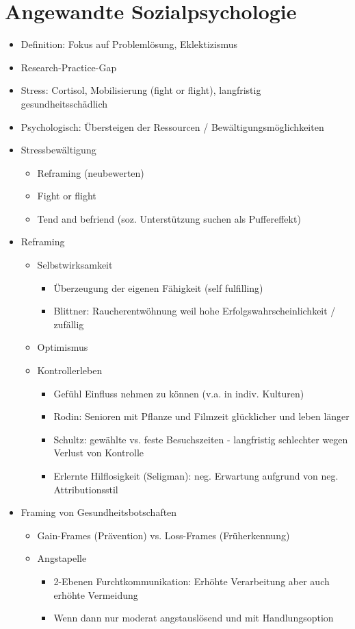 \documentclass[11pt, paper=a4, twocolumn]{scrartcl}
\begin{document}
	\section{Angewandte Sozialpsychologie}
		\begin{itemize}
			\item Definition: Fokus auf Problemlösung, Eklektizismus
			\item Research-Practice-Gap
			\item Stress: Cortisol, Mobilisierung (fight or flight), langfristig gesundheitsschädlich
			\item Psychologisch: Übersteigen der Ressourcen / Bewältigungsmöglichkeiten
			\item Stressbewältigung
				\begin{itemize}
					\item Reframing (neubewerten)
					\item Fight or flight
					\item Tend and befriend (soz. Unterstützung suchen als Puffereffekt)
				\end{itemize}
			\item Reframing
				\begin{itemize}
					\item Selbstwirksamkeit
						\begin{itemize}
							\item Überzeugung der eigenen Fähigkeit (self fulfilling)
							\item Blittner: Raucherentwöhnung weil hohe Erfolgswahrscheinlichkeit / zufällig
						\end{itemize}
					\item Optimismus
					\item Kontrollerleben
						\begin{itemize}
							\item Gefühl Einfluss nehmen zu können (v.a. in indiv. Kulturen)
							\item Rodin: Senioren mit Pflanze und Filmzeit glücklicher und leben länger
							\item Schultz: gewählte vs. feste Besuchszeiten - langfristig schlechter wegen Verlust von 
								Kontrolle
							\item Erlernte Hilflosigkeit (Seligman): neg. Erwartung aufgrund von neg. Attributionsstil
						\end{itemize}
				\end{itemize}
			\item Framing von Gesundheitsbotschaften
				\begin{itemize}
					\item Gain-Frames (Prävention) vs. Loss-Frames (Früherkennung)
					\item Angstapelle
						\begin{itemize}
							\item 2-Ebenen Furchtkommunikation: Erhöhte Verarbeitung aber auch erhöhte Vermeidung
							\item Wenn dann nur moderat angstauslösend und mit Handlungsoption
						\end{itemize}
				\end{itemize}
		\end{itemize}
\end{document}
